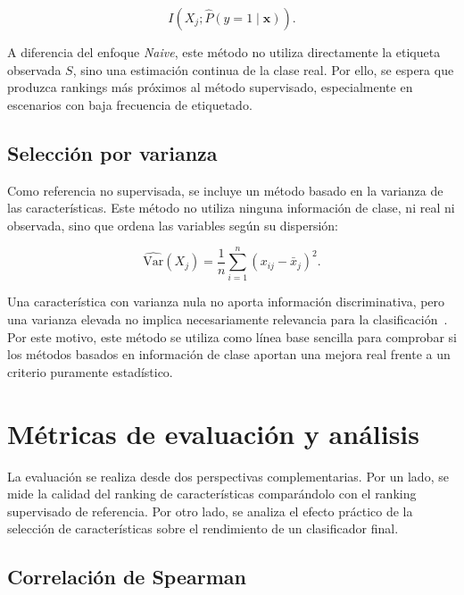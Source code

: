 \begin{equation}
I\left(X_j;\hat{P}(y=1 \mid \mathbf{x})\right).
\label{eq:mi_pumi}
\end{equation}

A diferencia del enfoque \textit{Naive}, este método no utiliza directamente la etiqueta observada $S$, sino una estimación continua de la clase real. Por ello, se espera que produzca rankings más próximos al método supervisado, especialmente en escenarios con baja frecuencia de etiquetado.

\subsection{Selección por varianza}
\label{subsec:varianza}

Como referencia no supervisada, se incluye un método basado en la varianza de las características. Este método no utiliza ninguna información de clase, ni real ni observada, sino que ordena las variables según su dispersión:

\begin{equation}
\widehat{\mathrm{Var}}(X_j)
=
\frac{1}{n}
\sum_{i=1}^{n}
(x_{ij}-\bar{x}_j)^2.
\label{eq:varianza}
\end{equation}

Una característica con varianza nula no aporta información discriminativa, pero una varianza elevada no implica necesariamente relevancia para la clasificación~\cite{guyon2003introduction}. Por este motivo, este método se utiliza como línea base sencilla para comprobar si los métodos basados en información de clase aportan una mejora real frente a un criterio puramente estadístico.

\section{Métricas de evaluación y análisis}
\label{sec:metricas}

La evaluación se realiza desde dos perspectivas complementarias. Por un lado, se mide la calidad del ranking de características comparándolo con el ranking supervisado de referencia. Por otro lado, se analiza el efecto práctico de la selección de características sobre el rendimiento de un clasificador final.

\subsection{Correlación de Spearman}
\label{subsec:spearman}

